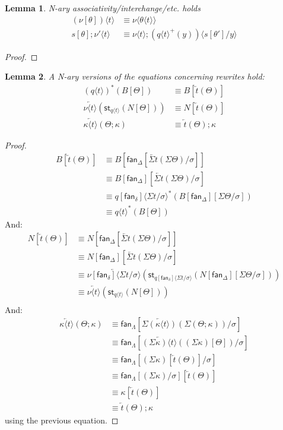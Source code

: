 \documentclass[10pt]{article}
\newtheorem{lemma}{Lemma}
\theoremstyle{definition}
\newcommand\fan[1]{\ensuremath{\mathsf{fan}_{#1}}}
\newcommand{\rewrite}[2]{\overleftarrow{#1}(#2)}
\newcommand\St[2]{\ensuremath{{#1}^*(#2)}}
\newcommand\StI[2]{\ensuremath{\mathsf{st}_{#1}(#2)}}
\newcommand\TrPlus[2]{\ensuremath{{#1}^+(#2)}}
\newcommand\ap[2]{\ensuremath{#1 \langle #2 \rangle }}
\begin{document}
\begin{lemma}
N-ary associativity/interchange/etc. holds
\begin{align*}
\ap {(\nu[\theta])} {t} &\equiv \ap \nu {\ap \theta {t}} \\
s[\theta];\ap{\nu'}{t} &\equiv \ap{\nu}{t};\ap{(\TrPlus{\ap{q}{t}}{y})}{s[\theta']/y}
\end{align*}
\end{lemma}
\begin{proof}
\end{proof}

\begin{lemma}
A N-ary versions of the equations concerning rewrites hold:
\begin{align*}
\St{(\ap{q}{t})}{B[\Theta]} &\equiv B[\rewrite{t}{\Theta}] \\
\rewrite{\ap{\nu}{t}}{\StI{\ap{q}{t}}{N[\Theta]}} &\equiv N[\rewrite{t}{\Theta}] \\
\rewrite{\ap{\kappa}{t}}{\Theta;\kappa} &\equiv \rewrite{t}{\Theta};\kappa
\end{align*}
\end{lemma}
\begin{proof}
\begin{align*}
B[\rewrite{t}{\Theta}] 
&\equiv B[\fan{\Delta}[\rewrite{\Sigma t}{\Sigma \Theta}/\sigma]] \\
&\equiv B[\fan{\Delta}][\rewrite{\Sigma t}{\Sigma \Theta}/\sigma] \\
&\equiv \St{\ap{q[\fan{\delta}]}{\Sigma t / \sigma}}{B[\fan{\Delta}][\Sigma \Theta/\sigma]} \\
&\equiv \St{\ap{q}{t}}{B[\Theta]}
\end{align*}
And:
\begin{align*}
N[\rewrite{t}{\Theta}]
&\equiv N[\fan{\Delta}[\rewrite{\Sigma t}{\Sigma \Theta}/\sigma]] \\
&\equiv N[\fan{\Delta}][\rewrite{\Sigma t}{\Sigma \Theta}/\sigma] \\
&\equiv \rewrite{\ap{\nu[\fan{\delta}]}{\Sigma t/\sigma}}{\StI{\ap{q[\fan{\delta}]}{\Sigma t/\sigma}}{N[\fan{\Delta}][\Sigma \Theta/\sigma]}} \\
&\equiv \rewrite{\ap{\nu}{t}}{\StI{\ap{q}{t}}{N[\Theta]}} \\
\end{align*}
And:
\begin{align*}
\rewrite{\ap{\kappa}{t}}{\Theta;\kappa}
&\equiv \fan{\Lambda}[\rewrite{\Sigma(\ap{\kappa}{t})}{\Sigma (\Theta;\kappa)}/\sigma] \\
&\equiv \fan{\Lambda}[\rewrite{\ap{(\Sigma \kappa)}{t}}{(\Sigma \kappa)[\Theta]}/\sigma] \\
&\equiv \fan{\Lambda}[(\Sigma \kappa)[\rewrite{t}{\Theta}]/\sigma] \\
&\equiv \fan{\Lambda}[(\Sigma \kappa)/\sigma][\rewrite{t}{\Theta}] \\
&\equiv \kappa[\rewrite{t}{\Theta}] \\
&\equiv \rewrite{t}{\Theta};\kappa
\end{align*}
using the previous equation.
\end{proof}
\end{document}
